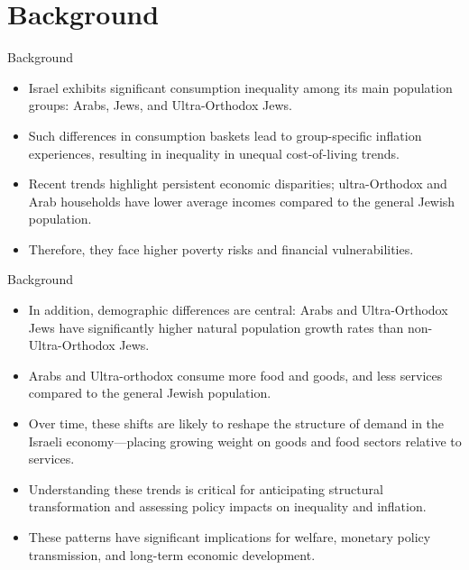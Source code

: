 \documentclass[10pt]{beamer}
\begin{document}
\section{Background}
\begin{frame}{Background}
	\begin{itemize}
		\item Israel exhibits significant consumption inequality among its main population groups: Arabs, Jews, and Ultra-Orthodox Jews.
		\item Such differences in consumption baskets lead to group-specific inflation experiences, resulting in inequality in unequal cost-of-living trends.
		\item Recent trends highlight persistent economic disparities; ultra-Orthodox and Arab households have lower average incomes compared to the general Jewish population.
		\item Therefore, they face higher poverty risks and financial vulnerabilities.
	\end{itemize}
\end{frame}
\begin{frame}{Background}
	\begin{itemize}
		\item In addition, demographic differences are central: Arabs and Ultra-Orthodox Jews have significantly higher natural population growth rates than non-Ultra-Orthodox Jews.
		\item Arabs and Ultra-orthodox consume more food and goods, and less services compared to the general Jewish population.
		\item Over time, these shifts are likely to reshape the structure of demand in the Israeli economy—placing growing weight on goods and food sectors relative to services.
		\item Understanding these trends is critical for anticipating structural transformation and assessing policy impacts on inequality and inflation.
		\item These patterns have significant implications for welfare, monetary policy transmission, and long-term economic development.
	\end{itemize}
\end{frame}
\end{document}
